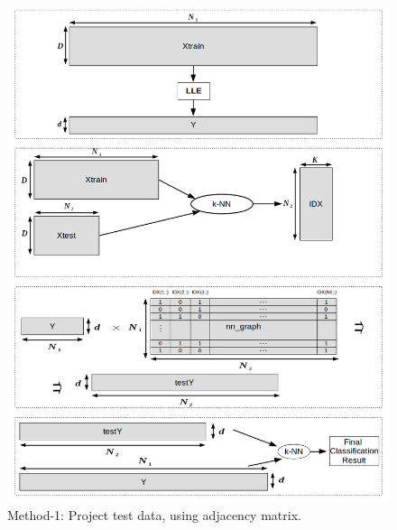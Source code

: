 \begin{figure}[t!]
\centering
\includegraphics[scale=0.8]{figs/5.png}
\newline
\caption{ \textlatin{Method-1: Project test data, using adjacency matrix}.} 
\end{figure}
\newpage

